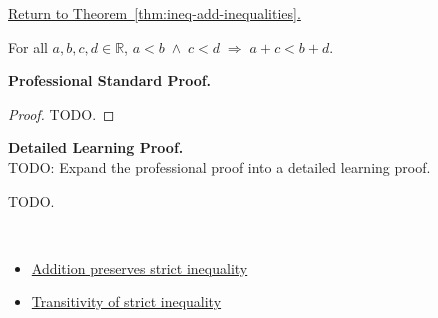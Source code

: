 \newpage
{}
\label{prf:ineq-add-inequalities}

\begin{remark*}[Return]
\hyperref[thm:ineq-add-inequalities]{Return to Theorem~\ref*{thm:ineq-add-inequalities}.}
\end{remark*}

\begin{theorem*}
For all $a, b, c, d \in \mathbb{R}$,
$a < b \;\land\; c < d \;\Rightarrow\; a + c < b + d$.
\end{theorem*}

\textbf{Professional Standard Proof.}~\\
\begin{proof}
TODO.
\end{proof}

\textbf{Detailed Learning Proof.}~\\
TODO: Expand the professional proof into a detailed learning proof.


\begin{remark*}
TODO.
\end{remark*}

\begin{remark*}[Dependencies]~\\
\begin{itemize}
  \item \hyperref[thm:ineq-add-both-sides]{Addition preserves strict inequality}
  \item \hyperref[thm:ineq-transitivity-strict]{Transitivity of strict inequality}
\end{itemize}
\end{remark*}
